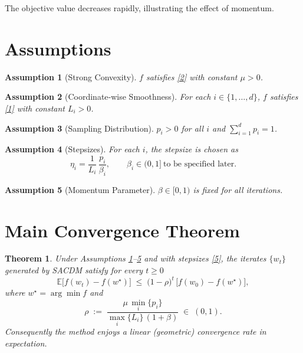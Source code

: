 \documentclass{article}
\newtheorem{theorem}{Theorem}
\newtheorem{assumption}{Assumption}
\newcommand{\E}{\mathbb{E}}
\begin{document}
The objective value decreases rapidly, illustrating the effect of momentum.

\newpage
\section*{Assumptions}
\begin{assumption}[Strong Convexity]\label{as:strong}
$f$ satisfies \eqref{2} with constant $\mu>0$.
\end{assumption}
\begin{assumption}[Coordinate‑wise Smoothness]\label{as:smooth}
For each $i\in\{1,\dots ,d\}$, $f$ satisfies \eqref{1} with constant $L_i>0$.
\end{assumption}
\begin{assumption}[Sampling Distribution]\label{as:prob}
$p_i>0$ for all $i$ and $\sum_{i=1}^{d}p_i=1$.
\end{assumption}
\begin{assumption}[Stepsizes]\label{as:steps}
For each $i$, the stepsize is chosen as 
\[
\eta_i = \frac{1}{L_i}\,\frac{p_i}{\beta_i},\qquad 
\beta_i\in(0,1]\ \text{to be specified later}.
\tag{5}
\]
\end{assumption}
\begin{assumption}[Momentum Parameter]\label{as:beta}
$\beta\in[0,1)$ is fixed for all iterations.
\end{assumption}

\section*{Main Convergence Theorem}
\begin{theorem}\label{thm:linear}
Under Assumptions \ref{as:strong}–\ref{as:beta} and with stepsizes \eqref{5},
the iterates $\{w_t\}$ generated by SACDM satisfy for every $t\ge 0$
\[
\E\!\bigl[ f(w_t)-f(w^{\star}) \bigr]\;\le\;
\bigl(1-\rho\bigr)^{t}\,\bigl[f(w_0)-f(w^{\star})\bigr],
\tag{6}
\]
where $w^{\star}=\arg\min f$ and 
\[
\rho\;:=\;\frac{\mu\,\min_i\{p_i\}}{\max_i\{L_i\}\,(1+\beta)}\;\in\;(0,1).
\tag{7}
\]
Consequently the method enjoys a linear (geometric) convergence rate in expectation.
\end{theorem}
\end{document}
